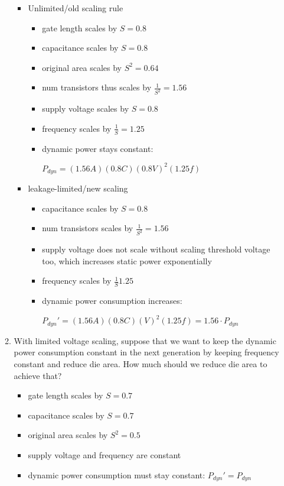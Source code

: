\documentclass[12pt]{extarticle}
\begin{document}
\begin{itemize}
\begin{enumerate}
				\begin{itemize}
					\item Unlimited/old scaling rule
					\begin{itemize}
						\item gate length scales by $S = 0.8$
						\item capacitance scales by $S = 0.8$
						\item original area scales by $S^2 = 0.64$
						\item num transistors thus scales by $\frac{1}{S^2} = 1.56$
						\item supply voltage scales by $S = 0.8$
						\item frequency scales by $\frac{1}{S} = 1.25$
						\item dynamic power stays constant:
					
						$P_{dyn} = (1.56A)(0.8C)(0.8V)^2(1.25f)$
					\end{itemize}
					
					\item leakage-limited/new scaling
					\begin{itemize}
						\item capacitance scales by $S = 0.8$
						\item num transistors scales by $\frac{1}{S^2} = 1.56$
						\item supply voltage does not scale without scaling threshold voltage too, which increases static power exponentially
						\item frequency scales by $\frac{1}{S} 1.25$
						\item dynamic power consumption increases:

						$P_{dyn}' = (1.56A)(0.8C)(V)^2(1.25f) = 1.56 \cdot P_{dyn}$
					\end{itemize}
				\end{itemize}

				\item With limited voltage scaling, suppose that we want to keep the dynamic power consumption constant in the next generation by keeping frequency constant and reduce die area. How much should we reduce die area to achieve that?
				\begin{itemize}
					\item gate length scales by $S = 0.7$
					\item capacitance scales by $S = 0.7$
					\item original area scales by $S^2 = 0.5$
					\item supply voltage and frequency are constant
					\item dynamic power consumption must stay constant: $P_{dyn}' = P_{dyn}$


\end{itemize}
\end{enumerate}
\end{itemize}
\end{document}
